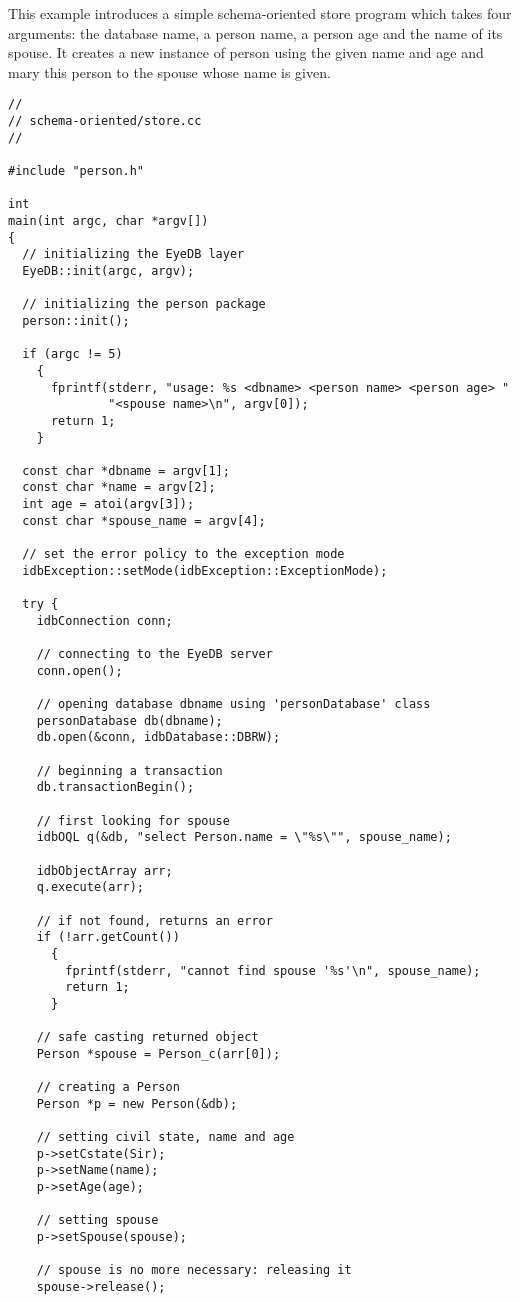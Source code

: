 This example introduces a simple schema-oriented store program which takes
four arguments: the database name, a person name, a person age and the
name of its spouse. It
creates a new instance of person using the given name and age and mary
this person to the spouse whose name is given.
\verbsize
\begin{verbatim}
//
// schema-oriented/store.cc
//

#include "person.h"

int
main(int argc, char *argv[])
{
  // initializing the EyeDB layer
  EyeDB::init(argc, argv);

  // initializing the person package
  person::init();

  if (argc != 5)
    {
      fprintf(stderr, "usage: %
              "<spouse name>\n", argv[0]);
      return 1;
    }

  const char *dbname = argv[1];
  const char *name = argv[2];
  int age = atoi(argv[3]);
  const char *spouse_name = argv[4];

  // set the error policy to the exception mode
  idbException::setMode(idbException::ExceptionMode);

  try {
    idbConnection conn;

    // connecting to the EyeDB server
    conn.open();

    // opening database dbname using 'personDatabase' class
    personDatabase db(dbname);
    db.open(&conn, idbDatabase::DBRW);

    // beginning a transaction
    db.transactionBegin();

    // first looking for spouse
    idbOQL q(&db, "select Person.name = \"%

    idbObjectArray arr;
    q.execute(arr);

    // if not found, returns an error
    if (!arr.getCount())
      {
        fprintf(stderr, "cannot find spouse '%
        return 1;
      }

    // safe casting returned object
    Person *spouse = Person_c(arr[0]);

    // creating a Person
    Person *p = new Person(&db);

    // setting civil state, name and age
    p->setCstate(Sir);
    p->setName(name);
    p->setAge(age);

    // setting spouse
    p->setSpouse(spouse);

    // spouse is no more necessary: releasing it
    spouse->release();


\end{verbatim}
